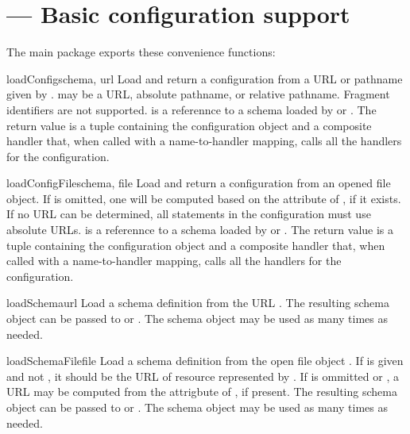 \documentclass{howto}
\begin{document}
\section{ --- Basic configuration support}


The main  package exports these convenience functions:

\begin{funcdesc}{loadConfig}{schema, url}
  Load and return a configuration from a URL or pathname given by
  .   may be a URL, absolute pathname, or relative
  pathname.  Fragment identifiers are not supported.   is
  a referennce to a schema loaded by  or
  .
  The return value is a tuple containing the configuration object and
  a composite handler that, when called with a name-to-handler
  mapping, calls all the handlers for the configuration.
\end{funcdesc}

\begin{funcdesc}{loadConfigFile}{schema, file}
  Load and return a configuration from an opened file object.  If
   is omitted, one will be computed based on the
   attribute of , if it exists.  If no URL can
  be determined, all  statements in the
  configuration must use absolute URLs.   is a referennce
  to a schema loaded by  or
  .
  The return value is a tuple containing the configuration object and
  a composite handler that, when called with a name-to-handler
  mapping, calls all the handlers for the configuration.
\end{funcdesc}

\begin{funcdesc}{loadSchema}{url}
  Load a schema definition from the URL .  The resulting
  schema object can be passed to  or
  .  The schema object may be used as many
  times as needed.
\end{funcdesc}

\begin{funcdesc}{loadSchemaFile}{file}
  Load a schema definition from the open file object .  If
   is given and not , it should be the URL of
  resource represented by .  If  is ommitted or
  , a URL may be computed from the  attrigbute
  of , if present.  The resulting schema object can
  be passed to  or .
  The schema object may be used as many times as needed.
\end{funcdesc}
\end{document}
